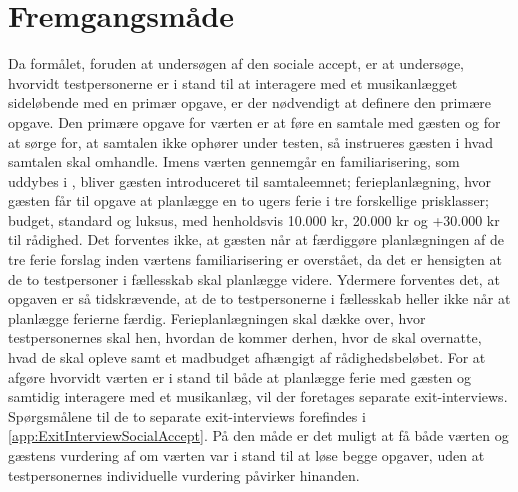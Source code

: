 \section{Fremgangsmåde}
\label{FremgangsmaadeSocialAccept}
%
Da formålet, foruden at undersøgen af den sociale accept, er at undersøge, hvorvidt testpersonerne er i stand til at interagere med et musikanlægget sideløbende med en primær opgave, er der nødvendigt at definere den primære opgave. Den primære opgave for værten er at føre en samtale med gæsten og for at sørge for, at samtalen ikke ophører under testen, så instrueres gæsten i hvad samtalen skal omhandle. Imens værten gennemgår en familiarisering, som uddybes i , bliver gæsten introduceret til samtaleemnet; ferieplanlægning, hvor gæsten får til opgave at planlægge en to ugers ferie i tre forskellige prisklasser; budget, standard og luksus, med henholdsvis 10.000 kr, 20.000 kr og +30.000 kr til rådighed. Det forventes ikke, at gæsten når at færdiggøre planlægningen af de tre ferie forslag inden værtens familiarisering er overstået, da det er hensigten at de to testpersoner i fællesskab skal planlægge videre. Ydermere forventes det, at opgaven er så tidskrævende, at de to testpersonerne i fællesskab heller ikke når at planlægge ferierne færdig. Ferieplanlægningen skal dække over, hvor testpersonernes skal hen, hvordan de kommer derhen, hvor de skal overnatte, hvad de skal opleve samt et madbudget afhængigt af rådighedsbeløbet. For at afgøre hvorvidt værten er i stand til både at planlægge ferie med gæsten og samtidig interagere med et musikanlæg, vil der foretages separate exit-interviews. Spørgsmålene til de to separate exit-interviews forefindes i \autoref{app:ExitInterviewSocialAccept}. På den måde er det muligt at få både værten og gæstens vurdering af om værten var i stand til at løse begge opgaver, uden at testpersonernes individuelle vurdering påvirker hinanden. \blankline
%
